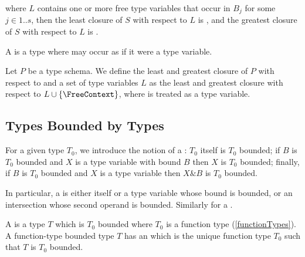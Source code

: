 \documentclass[makeidx]{article}
\begin{document}
{\begin{itemize}
  \noindent

  \noindent

  \noindent
  where $L$ contains one or more free type variables that occur in $B_j$
  for some $j \in 1 .. s$,
  then the least closure of $S$ with respect to $L$ is ,
  and the greatest closure of $S$ with respect to $L$ is \FUNCTION.
\end{itemize}

\LMHash{}%
A  is a type where
\FreeContext{} may occur as if it were a type variable.


\LMHash{}%
Let $P$ be a type schema.
We define the least and greatest closure of $P$
with respect to \FreeContext{} and a set of type variables $L$ as
the least and greatest closure with respect to $L \cup \{\FreeContext\}$,
where \FreeContext{} is treated as a type variable.



\subsection{Types Bounded by Types}

\LMHash{}%
For a given type $T_0$, we introduce the notion of a
:
$T_0$ itself is $T_0$ bounded;
if $B$ is $T_0$ bounded and
$X$ is a type variable with bound $B$
then $X$ is $T_0$ bounded;
finally, if $B$ is $T_0$ bounded and
$X$ is a type variable
then $X \& B$ is $T_0$ bounded.

\LMHash{}%
In particular, a
is either \DYNAMIC{} itself
or a type variable whose bound is \DYNAMIC{} bounded,
or an intersection whose second operand is \DYNAMIC{} bounded.
Similarly for a
.

\LMHash{}%
A
is a type $T$ which is $T_0$ bounded where $T_0$ is a function type
(\ref{functionTypes}).
A function-type bounded type $T$ has an
which is the unique function type $T_0$ such that $T$ is $T_0$ bounded.


}
\end{document}
